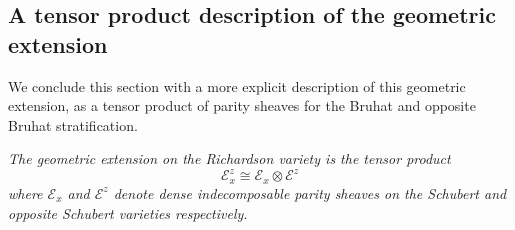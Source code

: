 \documentclass[11pt]{article}
\theoremstyle{remark}
\theoremstyle{definition}
\newenvironment{thmp}[1]{
  \renewcommand\thethmalt{#1}
  \thmalt
}{\endthmalt}
\begin{document}
\subsection{A tensor product description of the geometric extension}
\label{Ssec: Tensor product}

We conclude this section with a more explicit description of this geometric extension, as a tensor product of parity sheaves for the Bruhat and opposite Bruhat stratification.
\begin{thmp}{\ref{Thm: Tensor product}}
\emph{
The geometric extension on the Richardson variety is the tensor product \[\mathscr{E}^z_x\cong \mathscr{E}_x\otimes \mathscr{E}^z\] where $\mathscr{E}_x$ and $\mathscr{E}^z$ denote dense indecomposable parity sheaves on the Schubert and opposite Schubert varieties respectively.}
\end{thmp}
\end{document}
